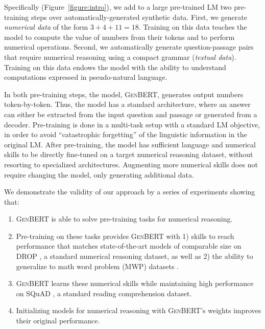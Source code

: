 \documentclass[11pt,a4paper]{article}
\newcommand\genbert{\textsc{GenBERT}}
\newcommand\drop{\textsc{DROP}}
\begin{document}
Specifically (Figure~\ref{figure:intro}), we add to a large pre-trained LM two pre-training steps over automatically-generated synthetic data. First, we generate \emph{numerical data} of the form $3 + 4 + 11=18$. Training on this data teaches the model to compute the value of numbers from their tokens and to perform numerical operations. Second, we automatically generate question-passage pairs that require numerical reasoning using a compact grammar (\emph{textual data}). Training on this data endows the model with the ability to understand computations expressed in pseudo-natural language. 

In both pre-training steps, the model, \genbert{}, generates output numbers token-by-token. Thus, the model has a standard architecture, where an answer can either be extracted from the input question and passage or generated from a decoder. Pre-training is done in a multi-task setup with a standard LM objective, in order to avoid ``catastrophic forgetting'' \cite{kirkpatrick2017overcoming} of the linguistic information in the original LM. After pre-training, the model has sufficient language and numerical skills to be directly fine-tuned on a target numerical reasoning dataset, without resorting to specialized architectures. Augmenting more numerical skills does not require changing the model, only generating additional data.

We demonstrate the validity of our approach by a series of experiments showing that: 
\begin{enumerate}[label=(\alph*),leftmargin=*,topsep=0pt,itemsep=0pt,parsep=0pt]
    \item \genbert{} is able to solve pre-training tasks for numerical reasoning.
    \item Pre-training on these tasks provides \genbert{} with 1) skills to reach performance that matches state-of-the-art models of comparable size on \drop{} \cite{dua2019drop}, a standard numerical reasoning dataset, as well as 2) the ability to generalize to math word problem (MWP) datasets \cite{koncel2016mawps}.
    \item \genbert{} learns these numerical skills while maintaining high performance on SQuAD \cite{rajpurkar2016squad}, a standard reading comprehension dataset.
    \item Initializing models for numerical reasoning with \genbert{}'s weights improves their original performance.
\end{enumerate}
\end{document}

